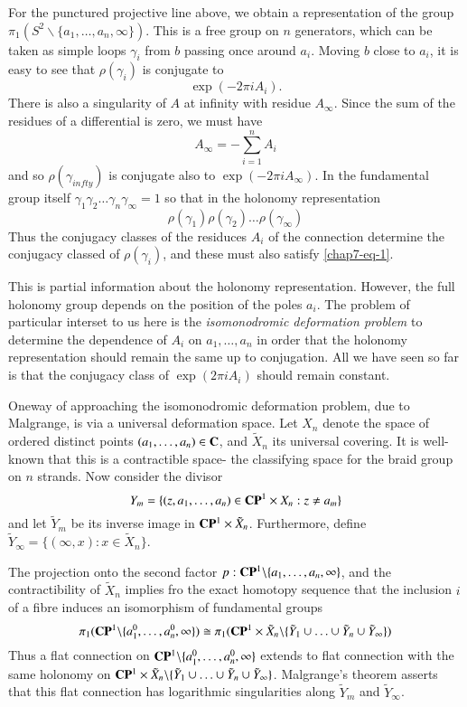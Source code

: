 For the punctured projective line above, we obtain a representation of the group $\pi_{1}(S^{2}\backslash \{a_{1}, \ldots, a_{n}, \infty\})$. This is a free group on $n$ generators, which can be taken as simple loops $\gamma_{i}$ from $b$ passing once around $a_{i}$. Moving $b$ close to $a_{i}$, it is easy to see that $ \rho(\gamma_{i})$ is conjugate to
$$
\exp(-2\pi iA_{i}).
$$
There is also a singularity of $A$ at infinity with residue $A_{\infty}$. Since the sum of the residues of a differential is zero, we must have
$$
A_{\infty} = -\sum\limits_{i=1}^{n}A_{i}
$$
and so $\rho(\gamma_{infty})$ is conjugate also to $\exp(-2\pi i A_{\infty})$. In the fundamental group itself $\gamma_{1} \gamma_{2}\ldots \gamma_{n}\gamma_{\infty} =1$ so that in the holonomy representation
\begin{equation*}\label{chap7-eq-1}
\rho(\gamma_{1})\rho(\gamma_{2})\ldots \rho(\gamma_{\infty})\tag{1}
\end{equation*}
Thus the conjugacy classes of the residuces $A_{i}$ of the connection determine the conjugacy classed of
$\rho(\gamma_{i})$, and these must also satisfy \eqref{chap7-eq-1}. 

This is partial information about the holonomy representation. However, the full holonomy group depends on the position of the poles $a_{i}$. The problem of particular interset to us here is the \textit{isomonodromic deformation problem} to determine the dependence of $A_{i}$ on $a_{1}, \ldots, a_{n}$ in order that the holonomy representation should remain the same up to conjugation. All we have seen so far is that the conjugacy class of $\exp(2\pi iA_{i})$ should remain constant.

One\pageoriginale way of approaching the isomonodromic deformation problem, due to Malgrange, is via a universal deformation space. Let $X_{n}$ denote the space of ordered distinct points $(a_{1}, \ldots, a_{n}) \in \mathbf{C}$, and $\tilde{X}_{n}$ its universal covering. It is well-known that this is a contractible space- the classifying space for the braid group on $n$ strands. Now consider the divisor
$$
Y_{m}= \{(z,a_{1}, \ldots , a_{n}) \in \mathbf{C}\mathbf{P}^{1} \times X_{n}: z \neq a_{m}\}
$$
and let $\tilde{Y}_{m}$ be its inverse image in $\mathbf{C}\mathbf{P}^{1} \times \tilde{X}_{n}$. Furthermore,
define $\tilde{Y}_{\infty} = \{(\infty, x) : x \in \tilde{X}_{n}\}$.

The projection onto the second factor $p : \mathbf{C}\mathbf{P}^{1} \backslash \{a_{1}, \ldots ,a_{n}, \infty\}$, and the contractibility of $\tilde{X}_{n}$ implies fro  the exact homotopy sequence that the inclusion $i$ of a fibre induces an isomorphism of fundamental groups
$$
\pi_{1}(\mathbf{C}\mathbf{P}^{1} \backslash \{a_{1}^{0}, \ldots, a_{n}^{0}, \infty\})\cong \pi_{1} (\mathbf{C}\mathbf{P}^{1} \times \tilde{X}_{n} \backslash \{\tilde{Y}_{1} \cup \ldots\cup \tilde{Y}_{n}\cup  \tilde{Y}_{\infty}\})
$$
Thus a flat connection on $\mathbf{C}\mathbf{P}^{1}\backslash \{a_{1}^{0}, \ldots, a_{n}^{0}, \infty\}$ extends to flat connection  with the same holonomy on $\mathbf{C}\mathbf{P}^{1} \times \tilde{X}_{n} \backslash \{\tilde{Y}_{1} \cup \ldots\cup \tilde{Y}_{n} \cup  \tilde{Y}_{\infty}\}$. Malgrange's theorem asserts that this flat connection has logarithmic singularities along $\tilde{Y}_{m}$ and $\tilde{Y}_{\infty}$.

